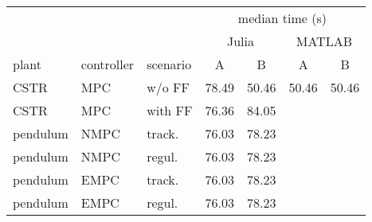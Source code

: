 \begin{tabular}{lllcccc}
	
\toprule %

	  &	& & \multicolumn{4}{c}{median time (s)} \\ \cmidrule(l){4-7}
	  & & & \multicolumn{2}{c}{Julia} & \multicolumn{2}{c}{MATLAB}  \\ \cmidrule(lr){4-5} \cmidrule(l){6-7} 
plant & controller & scenario & A & B & A & B \\
\midrule %

CSTR		& MPC	& w/o FF  	& \num{78.49} & \num{50.46} & \num{50.46} & \num{50.46} \\
CSTR		& MPC	& with FF 	& \num{76.36} & \num{84.05}  	\\
pendulum 	& NMPC	& track. 	& \num{76.03} & \num{78.23}  	\\
pendulum    & NMPC	& regul. 	& \num{76.03} & \num{78.23} 	\\
pendulum    & EMPC	& track.	& \num{76.03} & \num{78.23} 	\\
pendulum	& EMPC	& regul. 	& \num{76.03} & \num{78.23}  	\\
	
\bottomrule %
	
\end{tabular}